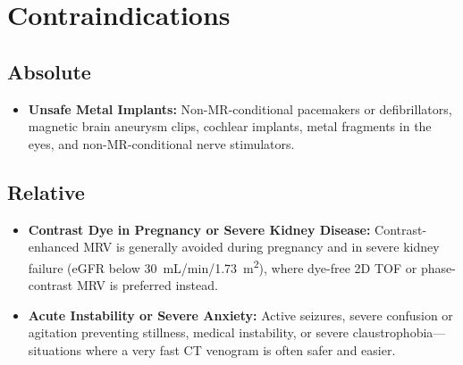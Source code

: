 \section{Contraindications}

\subsection{Absolute}
\begin{itemize}
\item \textbf{Unsafe Metal Implants:} Non-MR-conditional pacemakers or defibrillators, magnetic brain aneurysm clips, cochlear implants, metal fragments in the eyes, and non-MR-conditional nerve stimulators.
\end{itemize}

\subsection{Relative}
\begin{itemize}
\item \textbf{Contrast Dye in Pregnancy or Severe Kidney Disease:} Contrast-enhanced MRV is generally avoided during pregnancy and in severe kidney failure (eGFR below 30~mL/min/1.73~m\textsuperscript{2}), where dye-free 2D TOF or phase-contrast MRV is preferred instead.
\item \textbf{Acute Instability or Severe Anxiety:} Active seizures, severe confusion or agitation preventing stillness, medical instability, or severe claustrophobia---situations where a very fast CT venogram is often safer and easier.
\end{itemize}


